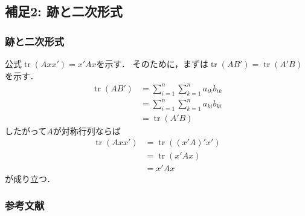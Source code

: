 \documentclass[10pt,hyperref={unicode}]{beamer}
\DeclareMathOperator*{\tr}{tr}
\newcommand{\parentheses}[1]{\left(#1\right)}
\begin{document}
\subsection{補足2: 跡と二次形式}
\label{sec:trace}
\begin{frame}
\frametitle{跡と二次形式}
公式$\tr \parentheses{Axx'} = x'Ax$を示す．
そのために，まずは$\tr \parentheses{AB'} = \tr\parentheses{A'B}$を示す．
\begin{align*}
    \tr \parentheses{AB'}
    &= \sum_{i = 1}^n \sum_{k = 1}^n a_{ik}b_{ik} \\
    &= \sum_{i = 1}^n \sum_{k = 1}^n a_{ki}b_{ki} \\
    &= \tr \parentheses{A'B}
\end{align*}
したがって$A$が対称行列ならば
\begin{align*}
    \tr \parentheses{Axx'}
    &= \tr \parentheses{\parentheses{x'A}'x'} \\
    &= \tr \parentheses{x'Ax} \\
    &= x'Ax
\end{align*}
が成り立つ．
\end{frame}

\begin{frame}
\frametitle{参考文献}


\end{frame}
\end{document}
